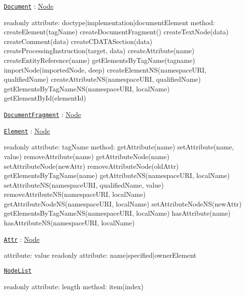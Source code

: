 \begin{DoxyItemize}
\item \href{http://www.w3.org/TR/2000/REC-DOM-Level-2-Core-20001113/core.html#i-Document}{\tt Document} \+: \mbox{\hyperlink{classNode}{Node}} \begin{DoxyVerb} readonly attribute:
     doctype|implementation|documentElement
 method:
     createElement(tagName)
     createDocumentFragment()
     createTextNode(data)
     createComment(data)
     createCDATASection(data)
     createProcessingInstruction(target, data)
     createAttribute(name)
     createEntityReference(name)
     getElementsByTagName(tagname)
     importNode(importedNode, deep)
     createElementNS(namespaceURI, qualifiedName)
     createAttributeNS(namespaceURI, qualifiedName)
     getElementsByTagNameNS(namespaceURI, localName)
     getElementById(elementId)
\end{DoxyVerb}

\item \href{http://www.w3.org/TR/2000/REC-DOM-Level-2-Core-20001113/core.html#ID-B63ED1A3}{\tt Document\+Fragment} \+: \mbox{\hyperlink{classNode}{Node}}
\item \href{http://www.w3.org/TR/2000/REC-DOM-Level-2-Core-20001113/core.html#ID-745549614}{\tt Element} \+: \mbox{\hyperlink{classNode}{Node}} \begin{DoxyVerb} readonly attribute:
     tagName
 method:
     getAttribute(name)
     setAttribute(name, value)
     removeAttribute(name)
     getAttributeNode(name)
     setAttributeNode(newAttr)
     removeAttributeNode(oldAttr)
     getElementsByTagName(name)
     getAttributeNS(namespaceURI, localName)
     setAttributeNS(namespaceURI, qualifiedName, value)
     removeAttributeNS(namespaceURI, localName)
     getAttributeNodeNS(namespaceURI, localName)
     setAttributeNodeNS(newAttr)
     getElementsByTagNameNS(namespaceURI, localName)
     hasAttribute(name)
     hasAttributeNS(namespaceURI, localName)
\end{DoxyVerb}

\item \href{http://www.w3.org/TR/2000/REC-DOM-Level-2-Core-20001113/core.html#ID-637646024}{\tt Attr} \+: \mbox{\hyperlink{classNode}{Node}} \begin{DoxyVerb} attribute:
     value
 readonly attribute:
     name|specified|ownerElement
\end{DoxyVerb}

\item \href{http://www.w3.org/TR/2000/REC-DOM-Level-2-Core-20001113/core.html#ID-536297177}{\tt Node\+List} \begin{DoxyVerb} readonly attribute:
     length
 method:
     item(index)
\end{DoxyVerb}


\end{DoxyItemize}
